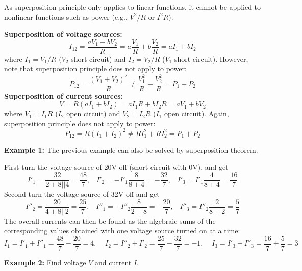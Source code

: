\begin{itemize}
As superposition principle only applies to linear functions, it cannot be
applied to nonlinear functions such as power (e.g., $V^2/R$ or $I^2R$). 


{\bf Superposition of voltage sources:}
\[	I_{12}=\frac{aV_1+bV_2}{R}=a\frac{V_1}{R}+b\frac{V_2}{R}=aI_1+bI_2 \]
where $I_1=V_1/R$ ($V_2$ short circuit) and $I_2=V_2/R$ ($V_1$ short circuit).
However, note that superposition principle does not apply to power:
\[
P_{12}=\frac{(V_1+V_2)^2}{R}\ne\frac{V_1^2}{R}+\frac{V_2^2}{R}=P_1+P_2
\]
{\bf Superposition of current sources:}
\[	V=R(aI_1+bI_2)=aI_1R+bI_2R=aV_1+bV_2 \]
where $V_1=I_1R$ ($I_2$ open circuit) and $V_2=I_2R$ ($I_1$ open circuit).
Again, superposition principle does not apply to power:
\[	P_{12}=R(I_1+I_2)^2 \ne RI_1^2+RI_2^2=P_1+P_2	\]

{\bf Example 1:} The previous example can also be solved by superposition 
theorem. 


First turn the voltage source of 20V off (short-circuit with 0V), and get
\[ I'_1=\frac{32}{2+8 || 4}=\frac{48}{7},\;\;\;I'_2=-I'_1\frac{8}{8+4}=-\frac{32}{7},
   \;\;\;I'_3=I'_1\frac{4}{8+4}=\frac{16}{7} \]
Second turn the voltage source of 32V off and get
\[ I''_2=\frac{20}{4+8 || 2}=\frac{25}{7},\;\;\;I''_1=-I''_2\frac{8}{2+8}=-\frac{20}{7},
   \;\;\;I''_3=I''_2\frac{2}{8+2}=\frac{5}{7} \]
The overall currents can then be found as the algebraic sums of the
corresponding values obtained with one voltage source turned on at a time:
\[ I_1=I'_1+I''_1=\frac{48}{7}-\frac{20}{7}=4,\;\;\;\;
   I_2=I''_2+I'_2=\frac{25}{7}-\frac{32}{7}=-1,\;\;\;\;
   I_3=I'_3+I''_3=\frac{16}{7}+\frac{5}{7}=3 \]

{\bf Example 2:} Find voltage $V$ and current $I$.



\end{itemize}
